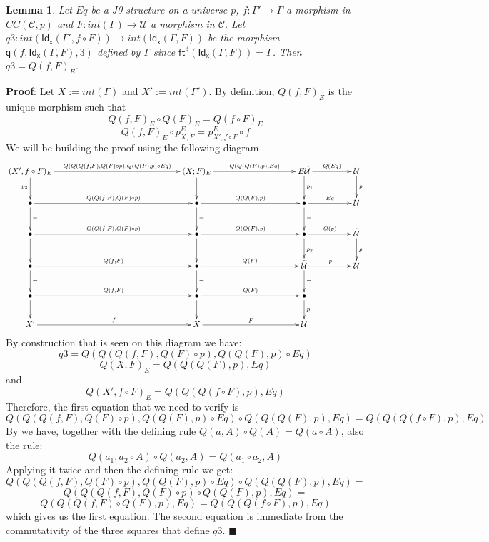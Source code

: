 \documentclass[12pt]{article}
\numberwithin{equation}{section}
\newenvironment{myproof}{{\bf Proof}:}{$\blacksquare$ \vskip 5mm }
\newtheorem{lemma}[proposition]{Lemma}
\newcommand{\llabel}[1]{\label{#1}}
\newcommand{\sr}{\rightarrow}
\newcommand{\wt}{\widetilde}
\newcommand{\BB}{{\bullet}}
\newcommand{\toCC}{CC} %
\newcommand{\ft}{\mathsf{ft}}
\newcommand{\q}{\mathsf{q}}
\newcommand{\Idx}{\mathsf{Id_x}} %
\newcommand{\U}{\mathcal{U}}
\begin{document}
\begin{lemma}
\llabel{2015.04.04.l4} Let $Eq$ be a J0-structure on a universe $p$,
$f:\Gamma'\sr \Gamma$ a morphism in $\toCC({\mathcal C},p)$ and $F:int(\Gamma)\sr
\U$ a morphism in $\mathcal C$.  Let $q3:int(\Idx(\Gamma',f\circ F))\sr
int(\Idx(\Gamma,F))$ be the morphism $\q(f,\Idx(\Gamma,F),3)$ defined by
$\Gamma$ since $\ft^3(\Idx(\Gamma,F))=\Gamma$. Then $q3=Q(f,F)_{E}$.
\end{lemma}
%
\begin{myproof}
Let $X:=int(\Gamma)$ and $X':=int(\Gamma')$. By definition, $Q(f,F)_{E}$ is the
unique morphism such that
%
$$Q(f,F)_{E}\circ Q(F)_{E}=Q(f\circ F)_{E}$$
$$Q(f,F)_{E}\circ p^{E}_{X,F}=p^{E}_{X',f\circ F}\circ f$$
%
We will be building the proof using the following diagram
%
$$
\begin{xy}
          \xymatrix@C=4pc{ (X',f\circ F)_{E} \ar[rrr]^-{Q(Q(Q(f,F),Q(F)\circ
              p),Q(Q(F),p)\circ Eq)} \ar[d]_{p_3} &&& (X;F)_{E}
            \ar[rr]^-{Q(Q(Q(F),p),Eq)} \ar[d] && E\wt{\U} \ar[r]^-{Q(Eq)}
            \ar[d]^{p_1} & \wt{\U} \ar[d]^{p}\\ \BB
            \ar[rrr]^-{Q(Q(f,F),Q(F)\circ p)} \ar[d]^{=} &&& \BB
            \ar[rr]^-{Q(Q(F),p)} \ar[d]^{=} && \BB \ar[r]^-{Eq} \ar[d]^{=}&
            \U\\ \BB \ar[rrr]^-{Q(Q(f,F),Q(F)\circ p)} \ar[d] &&& \BB
            \ar[rr]^-{Q(Q(F),p)} \ar[d] && \BB \ar[r]^-{Q(p)} \ar[d]^{p_2}&
            \wt{\U} \ar[d]^{p}\\ \BB \ar[rrr]^-{Q(f,F)} \ar[d]^{=}&&& \BB
            \ar[rr]^-{Q(F)} \ar[d]^{=} && \wt{\U} \ar[r]^-{p} \ar[d]^{=} & \U
            \\ \BB \ar[rrr]^-{Q(f,F)} \ar[d] &&& \BB \ar[rr]^-{Q(F)} \ar[d] &&
            \BB \ar[d]^{p}\\ X' \ar[rrr]^-{f} &&& X \ar[rr]^-{F} && \U }
\end{xy}
$$
%
By construction that is seen on this diagram we have:
%
$$q3=Q(Q(Q(f,F),Q(F)\circ p),Q(Q(F),p)\circ Eq)$$
$$Q(X,F)_{E}=Q(Q(Q(F),p),Eq)$$
%
and
%
$$Q(X', f\circ F)_{E}=Q(Q(Q(f\circ F),p),Eq)$$
%
Therefore, the first equation that we need to verify is
%
$$Q(Q(Q(f,F),Q(F)\circ p),Q(Q(F),p)\circ Eq)\circ Q(Q(Q(F),p),Eq)=Q(Q(Q(f\circ
F),p),Eq)$$
%
By \cite[Lemma 3.2]{fromunivwithPi} we have, together with the defining rule
$Q(a,A)\circ Q(A)=Q(a\circ A)$, also the rule:
%
$$Q(a_1,a_2\circ A)\circ Q(a_2,A)=Q(a_1\circ a_2, A)$$
%
Applying it twice and then the defining rule we get:
%
$$Q(Q(Q(f,F),Q(F)\circ p),Q(Q(F),p)\circ Eq)\circ Q(Q(Q(F),p),Eq)=$$
$$Q(Q(Q(f,F),Q(F)\circ p)\circ Q(Q(F),p), Eq)=$$
$$Q(Q(Q(f,F)\circ Q(F),p),Eq)=Q(Q(Q(f\circ F),p),Eq)$$
%
which gives us the first equation. The second equation is immediate from the
commutativity of the three squares that define $q3$.
\end{myproof}
\end{document}
